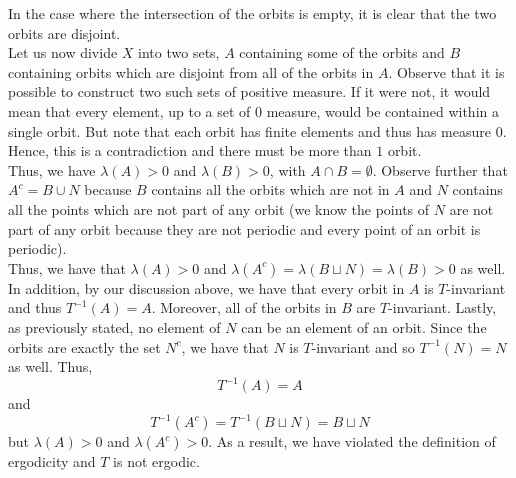 \documentclass[12pt]{article}
\newenvironment{problem}[2][Problem]{\begin{trivlist}
\item[\hskip \labelsep {\bfseries #1}\hskip \labelsep {\bfseries #2.}]}{\end{trivlist}}
\begin{document}
\begin{enumerate}[label=\alph*)]
In the case where the intersection of the orbits is empty, it is clear that the two orbits are disjoint.\\

Let us now divide $X$ into two sets, $A$ containing some of the orbits and $B$ containing orbits which are disjoint from all of the orbits in $A$. Observe that it is possible to construct two such sets of positive measure. If it were not, it would mean that every element, up to a set of $0$ measure, would be contained within a single orbit. But note that each orbit has finite elements and thus has measure $0$. Hence, this is a contradiction and there must be more than $1$ orbit.\\

Thus, we have $\lambda(A) > 0$ and $\lambda(B) > 0$, with $A \cap B = \emptyset$. Observe further that $A^c = B \cup N$ because $B$ contains all the orbits which are not in $A$ and $N$ contains all the points which are not part of any orbit (we know the points of $N$ are not part of any orbit because they are not periodic and every point of an orbit is periodic).\\

Thus, we have that $\lambda(A) > 0$ and $\lambda(A^c) = \lambda(B \sqcup N) = \lambda(B) > 0$ as well. In addition, by our discussion above, we have that every orbit in $A$ is $T$-invariant and thus $T^{-1}(A) = A$. Moreover, all of the orbits in $B$ are $T$-invariant. Lastly, as previously stated, no element of $N$ can be an element of an orbit. Since the orbits are exactly the set $N^c$, we have that $N$ is $T$-invariant and so $T^{-1}(N) = N$ as well. Thus, $$T^{-1}(A) = A$$ and $$T^{-1}(A^c) = T^{-1}(B \sqcup N) = B \sqcup N$$ but $\lambda(A) > 0$ and $\lambda(A^c) > 0$. As a result, we have violated the definition of ergodicity and $T$ is not ergodic.
\end{enumerate}

\begin{problem}{6}
\end{problem}
\end{document}
